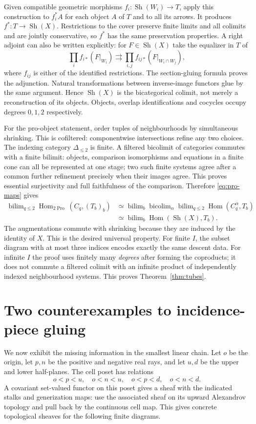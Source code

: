 \documentclass[11pt,a4paper]{article}
\theoremstyle{definition}
\newcommand{\Sh}{\operatorname{Sh}}
\newcommand{\Hom}{\operatorname{Hom}}
\newcommand{\Pro}{\operatorname{Pro}}
\begin{document}
Given compatible geometric morphisms $f_i:\Sh(W_i)\to T$, apply this construction to $f_i^*A$ for each object $A$ of $T$ and to all its arrows. It produces $f^*:T\to\Sh(X)$. Restrictions to the cover preserve finite limits and all colimits and are jointly conservative, so $f^*$ has the same preservation properties. A right adjoint can also be written explicitly: for $F\in\Sh(X)$ take the equalizer in $T$ of
\[
 \prod_i f_{i*}(F|_{W_i})
 \rightrightarrows
 \prod_{i,j} f_{ij*}(F|_{W_i\cap W_j}),
\]
where $f_{ij}$ is either of the identified restrictions. The section-gluing formula proves the adjunction. Natural transformations between inverse-image functors glue by the same argument. Hence $\Sh(X)$ is the bicategorical colimit, not merely a reconstruction of its objects. Objects, overlap identifications and cocycles occupy degrees $0,1,2$ respectively.

For the pro-object statement, order tuples of neighbourhoods by simultaneous shrinking. This is cofiltered: componentwise intersections refine any two choices. The indexing category $\Delta_{\le2}$ is finite. A filtered bicolimit of categories commutes with a finite bilimit: objects, comparison isomorphisms and equations in a finite cone can all be represented at one stage; two such finite systems agree after a common further refinement precisely when their images agree. This proves essential surjectivity and full faithfulness of the comparison. Therefore \eqref{eq:pro-maps} gives
\begin{align*}
 \mathop{\mathrm{bilim}}_{q\le2}\Hom_{2\Pro}(C_q,(T_b)_b)
 &\simeq \mathop{\mathrm{bilim}}_b\mathop{\mathrm{bicolim}}_\alpha
       \mathop{\mathrm{bilim}}_{q\le2}\Hom(C_q^\alpha,T_b)\\
 &\simeq\mathop{\mathrm{bilim}}_b\Hom(\Sh(X),T_b).
\end{align*}
The augmentations commute with shrinking because they are induced by the identity of $X$. This is the desired universal property. For finite $I$, the subset diagram with at most three indices encodes exactly the same descent data. For infinite $I$ the proof uses finitely many \emph{degrees} after forming the coproducts; it does not commute a filtered colimit with an infinite product of independently indexed neighbourhood systems. This proves Theorem~\ref{thm:tubes}.

\section{Two counterexamples to incidence-piece gluing}
We now exhibit the missing information in the smallest linear chain. Let $o$ be the origin, let $p,n$ be the positive and negative real rays, and let $u,d$ be the upper and lower half-planes. The cell poset has relations
\[
 o<p<u,\quad o<n<u,\quad o<p<d,\quad o<n<d.
\]
A covariant set-valued functor on this poset gives a sheaf with the indicated stalks and generization maps: use the associated sheaf on its upward Alexandrov topology and pull back by the continuous cell map. This gives concrete topological sheaves for the following finite diagrams.
\end{document}
